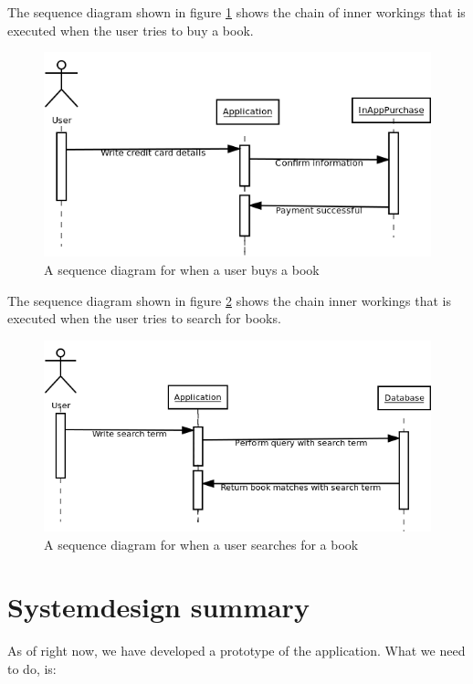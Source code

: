 \documentclass[12pt]{article}
\begin{document}
The sequence diagram shown in figure \ref{SeqDiaBuyBook} shows the chain of inner workings that is executed when the user tries to buy a book.
\begin{figure}[H]
\includegraphics[scale=0.6]{SequenceDiagramBuyBook.png}
\caption{A sequence diagram for when a user buys a book}
\label{SeqDiaBuyBook}
\end{figure}

The sequence diagram shown in figure \ref{SeqDiaBookSearch} shows the chain inner workings that is executed when the user tries to search for books.
\begin{figure}[H]
\includegraphics[scale=0.6]{SequenceDiagramBookSearch.png}
\caption{A sequence diagram for when a user searches for a book}
\label{SeqDiaBookSearch}
\end{figure}

\section{Systemdesign summary}
\label{sec:Syssum}
As of right now, we have developed a prototype of the application. What we need to do, is:\\
\end{document}
